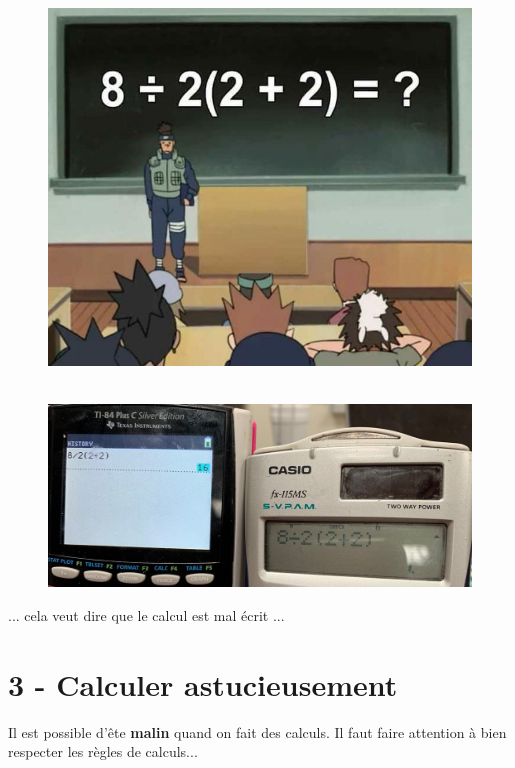 \documentclass[11pt]{article}
\begin{document}
\begin{minipage}[t]{0.5\textwidth}
  \begin{figure}[H]
        \centering
        \includegraphics[width=0.7\linewidth]{5x1-repondre-a-des-questions-de-calculs/naruto.png}
  \end{figure}
\end{minipage}
\begin{minipage}[t]{0.5\textwidth}
  \begin{figure}[H]
        \centering
        \includegraphics[width=\linewidth]{5x1-repondre-a-des-questions-de-calculs/calc.png}
  \end{figure}
... cela veut dire que le calcul est mal écrit ...
\end{minipage}


\section*{3 - Calculer astucieusement}

Il est possible d'ête \textbf{malin} quand on fait des calculs. Il faut faire attention à bien respecter les règles de calculs...
\end{document}
